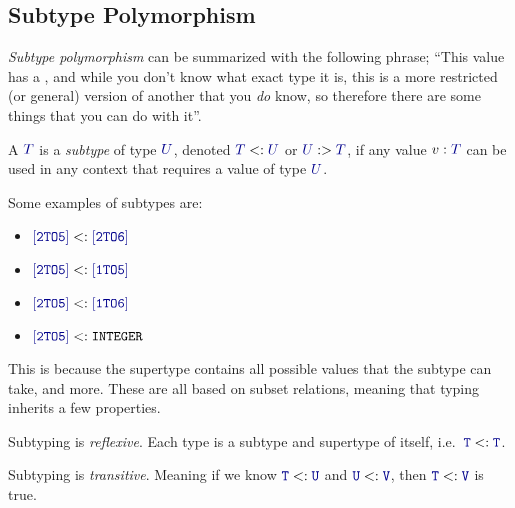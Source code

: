 \subsection{Subtype Polymorphism}\label{subsec:Subtype_Polymorphism}
\begin{definition}\label{def:Subtype_Polymorphism}
  \emph{Subtype polymorphism} can be summarized with the following phrase; ``This value has a , and while you don't know what exact type it is, this  is a more restricted (or general) version of another  that you \textit{do} know, so therefore there are some things that you can do with it''.
\end{definition}

\begin{definition}[Subtype]\label{def:Subtype}
  A  $\SemanticType{T}$ is a \emph{subtype} of type $\SemanticType{U}$, denoted $\SemanticType{T} <: \SemanticType{U}$ or $\SemanticType{U} :> \SemanticType{T}$, if any value $v : \SemanticType{T}$ can be used in any context that requires a value of type $\SemanticType{U}$.

  Some examples of subtypes are:
  \begin{itemize}[noitemsep]
  \item $\mathtt{\SemanticType{[2 TO 5]}} <: \mathtt{\SemanticType{[2 TO 6]}}$
  \item $\mathtt{\SemanticType{[2 TO 5]}} <: \mathtt{\SemanticType{[1 TO 5]}}$
  \item $\mathtt{\SemanticType{[2 TO 5]}} <: \mathtt{\SemanticType{[1 TO 6]}}$
  \item $\mathtt{\SemanticType{[2 TO 5]}} <: \mathtt{INTEGER}$
  \end{itemize}

  This is because the supertype contains all possible values that the subtype can take, and more.
  These are all based on subset relations, meaning that typing inherits a few properties.
  \begin{propertylist}
  \item Subtyping is \emph{reflexive}. Each type  is a subtype and supertype of itself, i.e.\ $\mathtt{\SemanticType{T}} <: \mathtt{\SemanticType{T}}$.\label{prop:Subtype_Reflexive}
  \item Subtyping is \emph{transitive}. Meaning if we know $\mathtt{\SemanticType{T}} <: \mathtt{\SemanticType{U}}$ and $\mathtt{\SemanticType{U}} <: \mathtt{\SemanticType{V}}$, then $\mathtt{\SemanticType{T}} <: \mathtt{\SemanticType{V}}$ is true.\label{prop:Subtype_Transitive}
  \end{propertylist}
\end{definition}

